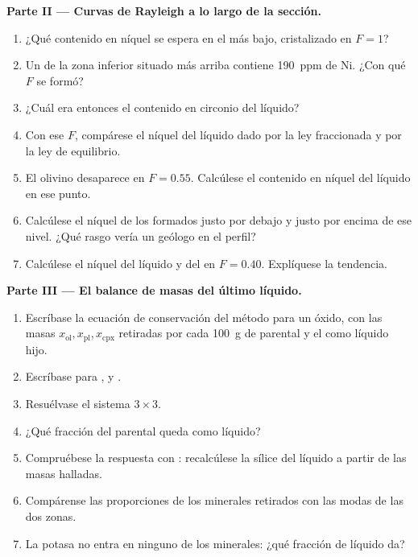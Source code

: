 \begin{problem}
\noindent\textbf{Parte II --- Curvas de Rayleigh a lo largo de la sección.}
\begin{enumerate}[resume]
\item ¿Qué contenido en níquel se espera en el  más bajo, cristalizado en
$F = 1$?
\item Un  de la zona inferior situado más arriba contiene \qty{190}{ppm} de Ni. ¿Con qué $F$ se
formó?
\item ¿Cuál era entonces el contenido en circonio del líquido?
\item Con ese $F$, compárese el níquel del líquido dado por la ley fraccionada y por la
ley de equilibrio.
\item El olivino desaparece en $F = 0.55$. Calcúlese el contenido en níquel del líquido
en ese punto.
\item Calcúlese el níquel de los  formados justo por debajo y justo por encima de ese
nivel. ¿Qué rasgo vería un geólogo en el perfil?
\item Calcúlese el níquel del líquido y del  en $F = 0.40$. Explíquese
la tendencia.
\end{enumerate}

\noindent\textbf{Parte III --- El balance de masas del último líquido.}
\begin{enumerate}[resume]
\item Escríbase la ecuación de conservación del método para un óxido, con las masas
$x_{\mathrm{ol}}, x_{\mathrm{pl}}, x_{\mathrm{cpx}}$ retiradas por cada \qty{100}{g} de
 parental y el  como líquido hijo.
\item Escríbase para ,  y .
\item Resuélvase el sistema $3 \times 3$.
\item ¿Qué fracción del  parental queda como líquido?
\item Compruébese la respuesta con : recalcúlese la sílice del líquido a partir de las
masas halladas.
\item Compárense las proporciones de los minerales retirados con las modas de las dos
zonas.
\item La potasa no entra en ninguno de los minerales: ¿qué fracción de líquido da?
\end{enumerate}


\end{problem}
